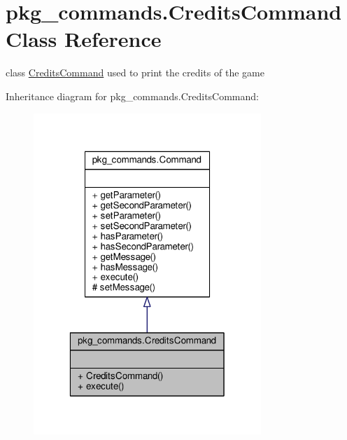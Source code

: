 \hypertarget{classpkg__commands_1_1CreditsCommand}{\section{pkg\-\_\-commands.\-Credits\-Command Class Reference}
\label{classpkg__commands_1_1CreditsCommand}
}


class \hyperlink{classpkg__commands_1_1CreditsCommand}{Credits\-Command} used to print the credits of the game  




Inheritance diagram for pkg\-\_\-commands.\-Credits\-Command\-:
\nopagebreak
\begin{figure}[H]
\begin{center}
\leavevmode
\includegraphics[width=244pt]{classpkg__commands_1_1CreditsCommand__inherit__graph}
\end{center}
\end{figure}


